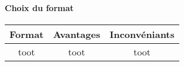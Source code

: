  
  \paragraph{Choix du format}
  
  
  \begin{table}
   \begin{tabular}{|c|c|c|}
    \hline
    Format & Avantages & Inconvéniants \\
    \hline
    \hline
    toot & toot & toot \\
    \hline
   \end{tabular}

  \end{table}
  

  
  